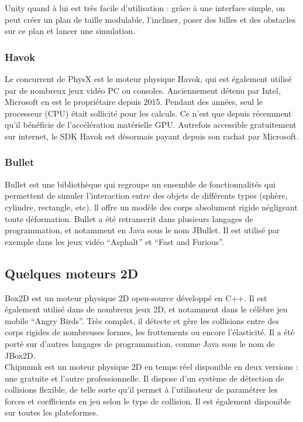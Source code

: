 \documentclass{report}
\begin{document}
	Unity quand à lui est très facile d’utilisation : grâce à une interface simple, on peut créer un plan de taille modulable, l’incliner, poser des billes et des obstacles sur ce plan et lancer une simulation.

    
\subsubsection{Havok}

Le concurrent de PhysX est le moteur physique Havok, qui est également utilisé par de nombreux jeux vidéo PC ou consoles. Anciennement détenu par Intel, Microsoft en est le propriétaire depuis 2015. Pendant des années, seul le processeur (CPU) était sollicité pour les calculs. Ce n’est que depuis récemment qu’il bénéficie de l’accélération matérielle GPU. Autrefois accessible gratuitement sur internet, le SDK Havok est désormais payant depuis son rachat par Microsoft.

\subsubsection{Bullet}

Bullet est une bibliothèque qui regroupe un ensemble de fonctionnalités qui permettent de simuler l'interaction entre des objets de différents types (sphère, cylindre,  rectangle, etc). ll offre un modèle des corps absolument rigide négligeant toute déformation. Bullet a été retranscrit dans plusieurs langages de programmation, et notamment en Java sous le nom JBullet. Il est utilisé par exemple dans les jeux vidéo “Asphalt” et “Fast and Furious”.

\subsection{Quelques moteurs 2D}

Box2D est un moteur physique 2D open-source développé en C++. Il est également utilisé dans de nombreux jeux 2D, et notamment dans le célèbre jeu mobile “Angry Birds”. Très complet, il détecte et gère les collisions entre des corps rigides de nombreuses formes, les frottements ou encore l’élasticité. Il a été porté sur d’autres langages de programmation, comme Java sous le nom de JBox2D. \\

Chipmunk est un moteur physique 2D en temps réel disponible en deux versions : une gratuite et l’autre professionnelle. Il dispose d’un système de détection de collisions flexible, de telle sorte qu’il permet à l'utilisateur de paramétrer les forces et coefficients en jeu selon le type de collision. Il est également disponible sur toutes les plateformes. \\
\end{document}
